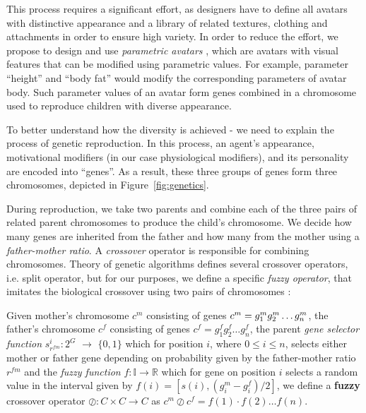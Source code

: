 This process requires a significant effort, as designers have to define all avatars with distinctive appearance and a library of related textures, clothing and attachments in order to ensure high variety. In order to reduce the effort, we propose to design and use \textit{parametric avatars} \cite{lewis2000a} \cite{trescak2012v}, which are avatars with visual features that can be modified using parametric values. For example, parameter ``height'' and ``body fat'' would modify the corresponding parameters of avatar body. Such parameter values of an avatar form genes combined in a chromosome used to reproduce children with diverse appearance.

To better understand how the diversity is achieved - we need to explain the process of genetic reproduction. In this process, an agent's appearance, motivational modifiers (in our case physiological modifiers), and its personality are encoded into ``genes''. As a result, these three groups of genes form three chromosomes, depicted in Figure~\ref{fig:genetics}.



   

During reproduction, we take two parents and combine each of the three pairs of related parent chromosomes to produce the child's chromosome. We decide how many genes are inherited from the father and how many from the mother using a \textit{father-mother ratio}. A \textit{crossover} operator is responsible for combining chromosomes. Theory of genetic algorithms defines several crossover operators, i.e. split operator, but for our purposes, we define a specific \textit{fuzzy operator}, that imitates the biological crossover using two pairs of chromosomes \cite{vieira10}:


\begin{definition}
Given mother's chromosome $c^m$ consisting of genes $c^m = g_{1}^{m}g_{2}^{m} \ldots \\ g_{n}^{m}$, the father's chromosome $c^f$ consisting of genes $c^f = g_{1}^{f}g_{2}^{f} \ldots g_{n}^{f}$, the parent \textit{gene selector function} $s_{r^{fm}}^{i}: 2^G$ $\rightarrow$ $\{0, 1\}$ which for position $i$, where $0 \leq i \leq n$,  selects either mother or father gene depending on probability given by the father-mother ratio $r^{fm}$ and the \textit{fuzzy function} $f: \mathbb{I} \rightarrow \mathbb{R}$ which for gene on position $i$ selects a random value in the interval given by $f(i) = [s(i), (g_{i}^{m}-g_{i}^{f}) / 2]$, we define a \textbf{fuzzy} crossover operator $\oslash: C \times C \rightarrow C$ as $c^m \oslash c^f = f(1) \cdot f(2) \ldots f(n)$.
\end{definition}  


